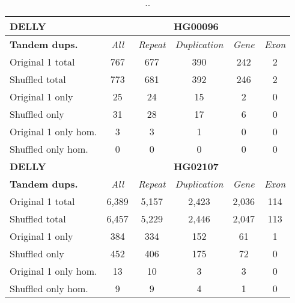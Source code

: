 \begin{table}[htb]
\caption{ .. }
\begin{center}
\begin{tabular}{|l|c||c|c|c|c|}
\hline
{\bf DELLY} & \multicolumn{5}{|c|}{\bf HG00096} \\
\hline
\cline{2-6}
{\bf Tandem dups.} & {\it All} & {\it Repeat} & {\it Duplication} & {\it Gene} & {\it Exon} \\
\hline
Original 1 total & 767 & 677 & 390 & 242 & 2\\ 
\hline
Shuffled total & 773 & 681 & 392 & 246 & 2\\ 
\hline
Original 1 only & 25 & 24 & 15 & 2 & 0\\ 
\hline
Shuffled only & 31 & 28 & 17 & 6 & 0\\ 
\hline
Original 1 only hom. & 3 & 3 & 1 & 0 & 0\\ 
\hline
Shuffled only hom. & 0 & 0 & 0 & 0 & 0\\ 
\hline
\hline
{\bf DELLY} & \multicolumn{5}{|c|}{\bf HG02107} \\
\hline
\cline{2-6}
{\bf Tandem dups.} & {\it All} & {\it Repeat} & {\it Duplication} & {\it Gene} & {\it Exon} \\
\hline
Original 1 total & 6,389 & 5,157 & 2,423 & 2,036 & 114\\ 
\hline
Shuffled total & 6,457 & 5,229 & 2,446 & 2,047 & 113\\ 
\hline
Original 1 only & 384 & 334 & 152 & 61 & 1\\ 
\hline
Shuffled only & 452 & 406 & 175 & 72 & 0\\ 
\hline
Original 1 only hom. & 13 & 10 & 3 & 3 & 0\\ 
\hline
Shuffled only hom. & 9 & 9 & 4 & 1 & 0\\ 
\hline
\end{tabular}
\end{center}
\label{tab:orig-vs-shuf-delly-dups}
\end{table}

